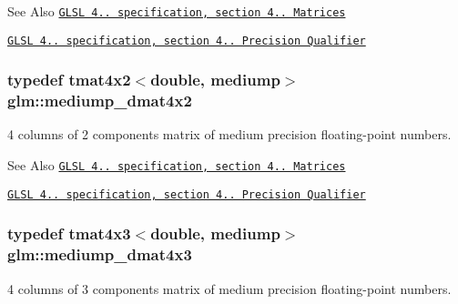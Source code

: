 \begin{DoxySeeAlso}{See Also}
\href{http://www.opengl.org/registry/doc/GLSLangSpec.4.20.8.pdf}{\tt G\-L\-S\-L 4.. specification, section 4.. Matrices} 

\href{http://www.opengl.org/registry/doc/GLSLangSpec.4.20.8.pdf}{\tt G\-L\-S\-L 4.. specification, section 4.. Precision Qualifier} 
\end{DoxySeeAlso}
\hypertarget{group__core__precision_gaee918464c0be014e744ff38f37c18585}{
\subsubsection[{mediump\-\_\-dmat4x2}]{\setlength{\rightskip}{0pt plus 5cm}typedef tmat4x2$<$double, mediump$>$ {\bf glm\-::mediump\-\_\-dmat4x2}}}\label{group__core__precision_gaee918464c0be014e744ff38f37c18585}
4 columns of 2 components matrix of medium precision floating-\/point numbers.

\begin{DoxySeeAlso}{See Also}
\href{http://www.opengl.org/registry/doc/GLSLangSpec.4.20.8.pdf}{\tt G\-L\-S\-L 4.. specification, section 4.. Matrices} 

\href{http://www.opengl.org/registry/doc/GLSLangSpec.4.20.8.pdf}{\tt G\-L\-S\-L 4.. specification, section 4.. Precision Qualifier} 
\end{DoxySeeAlso}
\hypertarget{group__core__precision_ga9870d3f13ee4601a8abf75f6b54440b9}{
\subsubsection[{mediump\-\_\-dmat4x3}]{\setlength{\rightskip}{0pt plus 5cm}typedef tmat4x3$<$double, mediump$>$ {\bf glm\-::mediump\-\_\-dmat4x3}}}\label{group__core__precision_ga9870d3f13ee4601a8abf75f6b54440b9}
4 columns of 3 components matrix of medium precision floating-\/point numbers.

